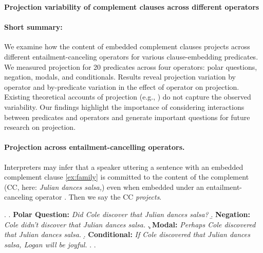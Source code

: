 \documentclass[11pt, a4paper]{article}
\begin{document}

\enablehyphenation

\begin{center}
	\textbf{\large%
		Projection variability of complement clauses across different operators}
\end{center}

\paragraph{Short summary:} %
	We examine how the content of embedded complement clauses projects across different entailment-canceling operators for various clause-embedding predicates.
	We measured projection for 20 predicates across four operators: polar questions, negation, modals, and conditionals. Results reveal projection variation by operator and by-predicate variation in the effect of operator on projection.
	Existing theoretical accounts of projection (e.g., \citealt{heim_projection_1983,van_der_sandt_presupposition_1992,abrusan_predicting_2011,schlenker_triggering_2021}) do not capture the observed variability.
	Our findings highlight the importance of considering interactions between predicates and operators and generate important questions for future research on projection.


\paragraph{Projection across entailment-cancelling operators.}
	Interpreters may infer that a speaker uttering a sentence with an embedded complement clause \ref{ex:family} is committed to the content of the complement (CC, here: \emph{Julian dances salsa,})
	even when embedded under an entailment-canceling operator \Next[a-d]. Then we say the CC \emph{projects}.

	\ex. \label{ex:family}
		\a. \label{ex:q}
			{\bf Polar Question:} \hfill
			\emph{Did Cole discover that Julian dances salsa?}
		\b. \label{ex:neg}
			{\bf Negation:} \hfill
			\emph{Cole didn't discover that Julian dances salsa.}
		\c. \label{ex:mod}
			{\bf Modal:} \hfill
			\emph{Perhaps Cole discovered that Julian dances salsa.}
		\d. \label{ex:cond}
			{\bf Conditional:} \hfill
			\emph{If Cole discovered that Julian dances salsa, Logan will be joyful.}
		\z.
	\z.
	
\end{document}
